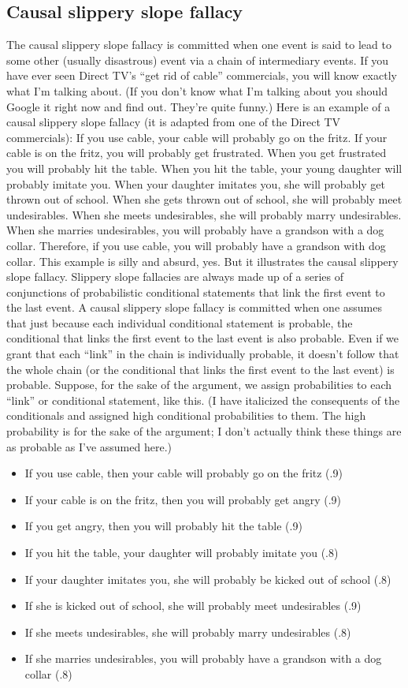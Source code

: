 \subsection{Causal slippery slope fallacy}
The causal slippery slope fallacy is committed when one event is said to lead to
some other (usually disastrous) event via a chain of intermediary events. If you
have ever seen Direct TV's ``get rid of cable'' commercials, you will know exactly
what I'm talking about. (If you don't know what I'm talking about you should
Google it right now and find out. They're quite funny.) Here is an example of a
causal slippery slope fallacy (it is adapted from one of the Direct TV
commercials):
If you use cable, your cable will probably go on the fritz. If your cable is
on the fritz, you will probably get frustrated. When you get frustrated you
will probably hit the table. When you hit the table, your young daughter
will probably imitate you. When your daughter imitates you, she will
probably get thrown out of school. When she gets thrown out of school,
she will probably meet undesirables. When she meets undesirables, she
will probably marry undesirables. When she marries undesirables, you
will probably have a grandson with a dog collar. Therefore, if you use
cable, you will probably have a grandson with dog collar.
This example is silly and absurd, yes. But it illustrates the causal slippery slope
fallacy. Slippery slope fallacies are always made up of a series of conjunctions of
probabilistic conditional statements that link the first event to the last event. A
causal slippery slope fallacy is committed when one assumes that just because
each individual conditional statement is probable, the conditional that links the
first event to the last event is also probable. Even if we grant that each ``link'' in
the chain is individually probable, it doesn't follow that the whole chain (or the
conditional that links the first event to the last event) is probable. Suppose, for
the sake of the argument, we assign probabilities to each ``link'' or conditional
statement, like this. (I have italicized the consequents of the conditionals and
assigned high conditional probabilities to them. The high probability is for the
sake of the argument; I don't actually think these things are as probable as I've
assumed here.)
\begin{itemize}
\item If you use cable, then your cable will probably go on the fritz (.9)
\item If your cable is on the fritz, then you will probably get angry (.9)
\item If you get angry, then you will probably hit the table (.9)
\item If you hit the table, your daughter will probably imitate you (.8)
\item If your daughter imitates you, she will probably be kicked out of school (.8)
\item If she is kicked out of school, she will probably meet undesirables (.9)
\item If she meets undesirables, she will probably marry undesirables (.8)
\item If she marries undesirables, you will probably have a grandson with a dog collar (.8)
\end{itemize}
